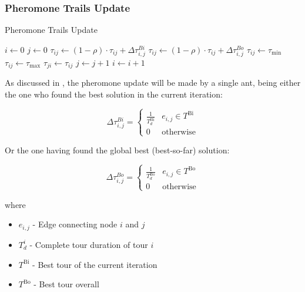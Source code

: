 \begin{homeworkProblem}
\subsubsection{Pheromone Trails Update}
\begin{algorithm}[!h]
  \caption{Pheromone Trails Update}\label{update}
  \begin{algorithmic}[1]
     \State $i \gets 0$
      \State $j \gets 0$
          \State $\tau_{ij} \gets (1-\rho)\cdot\tau_{ij}+\Delta\tau_{i,j}^{Bi}$
          \Else
          \State $\tau_{ij} \gets (1-\rho)\cdot\tau_{ij}+\Delta\tau_{i,j}^{Bo}$
          \EndIf
            \State $\tau_{ij} \gets \tau_{\min}$
          \EndIf
            \State $\tau_{ij} \gets \tau_{\max}$
          \EndIf
          \State $\tau_{ji} \gets \tau_{ij}$
          \State $ j \gets j + 1$  
        \EndFor
        \State $ i \gets i + 1$ 
      \EndFor
    \EndProcedure
\end{algorithmic}
\end{algorithm}

As discussed in , the pheromone update will be made by a single ant, being either the one who found the best solution in the current iteration: 

\begin{equation}
  \Delta\tau_{i,j}^{Bi} = \begin{cases}
    \frac{1}{T_{d}^{\text{Bi}}} & e_{i,j} \in T^{\text{Bi}}  \\
    0 & \text{otherwise} 
      \end{cases}
\end{equation}

Or the one having found the global best (best-so-far) solution:

\begin{equation}
  \Delta\tau_{i,j}^{Bo} = \begin{cases}
    \frac{1}{T_{d}^{\text{Bo}}} & e_{i,j} \in T^{\text{Bo}}  \\
    0 & \text{otherwise} 
  \end{cases}
\end{equation}

where
\begin{itemize}
\item $e_{i,j}$ - Edge connecting node $i$ and $j$
\item $T_{d}^{i}$ - Complete tour duration of tour $i$
\item $T^{\text{Bi}}$ - Best tour of the current iteration
\item $T^{\text{Bo}}$ - Best tour overall 
\end{itemize}



\end{homeworkProblem}
